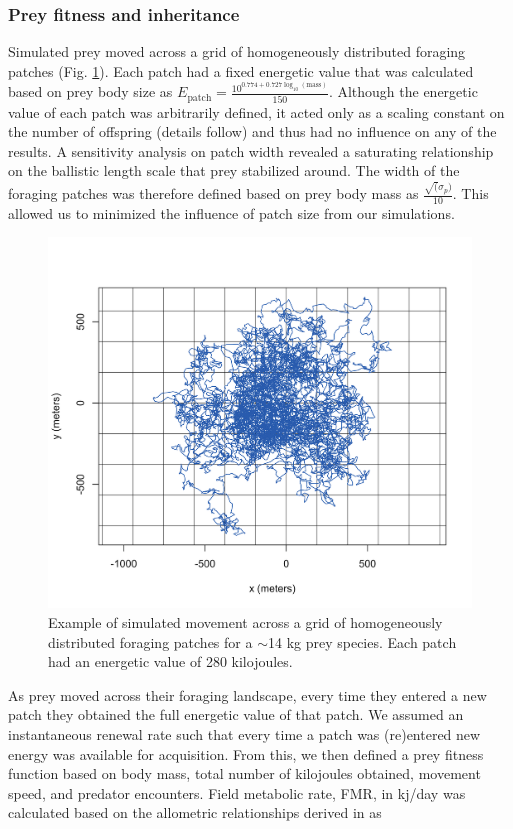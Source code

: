 \documentclass[12pt]{article}
\begin{document}
\subsubsection*{Prey fitness and inheritance}

Simulated prey moved across a grid of homogeneously distributed foraging patches (Fig. \ref{fig:Prey_Example}). Each patch had a fixed energetic value that was calculated based on prey body size as $E_{\mathrm{patch}} = \frac{10^{0.774 + 0.727\log_{10}(\mathrm{mass})}}{150}$. Although the energetic value of each patch was arbitrarily defined, it acted only as a scaling constant on the number of offspring (details follow) and thus had no influence on any of the results. A sensitivity analysis on patch width revealed a saturating relationship on the ballistic length scale that prey stabilized around. The width of the foraging patches was therefore defined based on prey body mass as $\frac{\sqrt(\sigma_p)}{10}$. This allowed us to minimized the influence of patch size from our simulations. 

\begin{figure}[!h]
\centering
\includegraphics[scale=1]{Prey_Movement.png}
\caption{Example of simulated movement across a grid of homogeneously distributed foraging patches for a $\sim$14 kg prey species. Each patch had an energetic value of 280 kilojoules.}
\label{fig:Prey_Example}
\end{figure}

As prey moved across their foraging landscape, every time they entered a new patch they obtained the full energetic value of that patch. We assumed an instantaneous renewal rate such that every time a patch was (re)entered new energy was available for acquisition. From this, we then defined a prey fitness function based on body mass, total number of kilojoules obtained, movement speed, and predator encounters. Field metabolic rate, FMR, in kj/day was calculated based on the allometric relationships derived in \cite{Nagy:1987} as 
\end{document}
